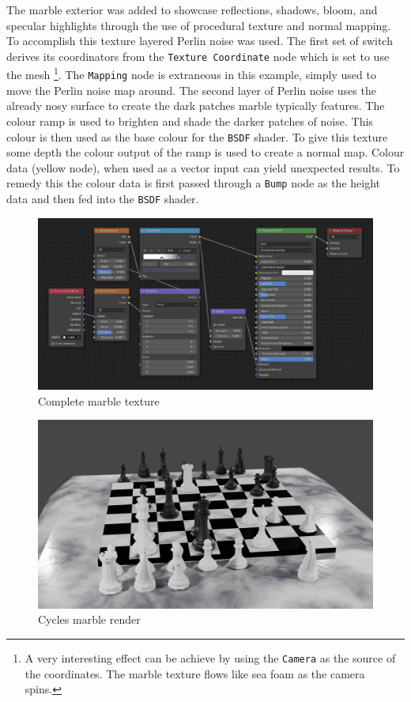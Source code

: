 \documentclass[11pt]{article}
\begin{document}
The marble exterior was added to showcase reflections, shadows, bloom, and specular
highlights through the use of procedural texture and normal mapping.\\

To accomplish this texture layered Perlin noise was used. The first set of
switch derives its coordinators from the \texttt{Texture Coordinate} node which is set
to use the mesh \footnote{A very interesting effect can be achieve by using the \texttt{Camera} as the
source of the coordinates. The marble texture flows like sea foam as the camera spins.}. The \texttt{Mapping} node is extraneous in this example, simply
used to move the Perlin noise map around. The second layer of Perlin noise uses
the already nosy surface to create the dark patches marble typically features.
The colour ramp is used to brighten and shade the darker patches of noise. This
colour is then used as the base colour for the \texttt{BSDF} shader. To give this
texture some depth the colour output of the ramp is used to create a normal map.
Colour data (yellow node), when used as a vector input can yield unexpected results.
To remedy this the colour data is first passed through a \texttt{Bump} node as the height
data and then fed into the \texttt{BSDF} shader.
\begin{figure}[htbp]
\centering
\includegraphics[width=\textwidth]{Images/marbletextire.png}
\caption{\label{marble-texture}Complete marble texture}
\end{figure}

\begin{figure}[htbp]
\centering
\includegraphics[width=\textwidth]{Images/Marble cycles.png}
\caption{Cycles marble render}
\end{figure}
\end{document}
